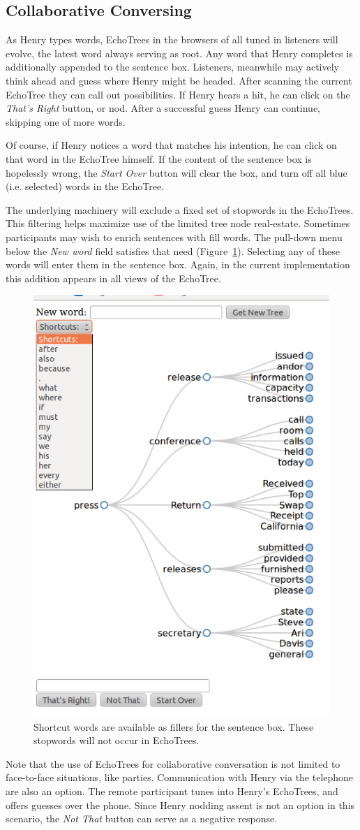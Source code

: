 \documentclass{sigchi}
\begin{document}
\subsection{Collaborative Conversing}
As Henry types words, EchoTrees in the browsers of all tuned in
listeners will evolve, the latest word always serving as root. Any
word that Henry completes is additionally appended to the sentence
box. Listeners, meanwhile may actively think ahead and guess where
Henry might be headed. After scanning the current EchoTree they can
call out possibilities. If Henry hears a hit, he can click on the {\em
  That's Right} button, or nod. After a successful guess Henry can
continue, skipping one of more words.

Of course, if Henry notices a word that matches his intention, he can
click on that word in the EchoTree himself. If the content of the
sentence box is hopelessly wrong, the {\em Start Over} button will
clear the box, and turn off all blue (i.e. selected) words in the
EchoTree. 

The underlying machinery will exclude a fixed set of stopwords in the
EchoTrees. This filtering helps maximize use of the limited tree node
real-estate. Sometimes participants may wish to enrich sentences with
fill words. The pull-down menu below the {\em New word} field
satisfies that need (Figure~\ref{fig:shortcuts}). Selecting any of
these words will enter them in the sentence box. Again, in the current
implementation this addition appears in all views of the EchoTree.
\begin{figure}
   \centering
   \includegraphics[width=0.5\columnwidth]{Figs/echoTreePulldownSnapshotSmall.png}
   \caption{Shortcut words are available as fillers for the sentence
     box. These stopwords will not occur in EchoTrees.}
   \label{fig:shortcuts}
\end{figure}
Note that the use of EchoTrees for collaborative conversation is not
limited to face-to-face situations, like parties. Communication
with Henry via the telephone are also an option. The remote
participant tunes into Henry's EchoTrees, and offers guesses over the
phone. Since Henry nodding assent is not an option in this scenario,
the {\em Not That} button can serve as a negative response.
\end{document}
